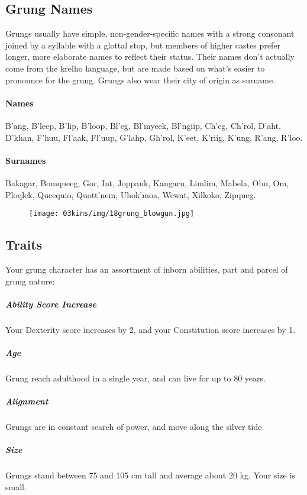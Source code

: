 \subsection*{Grung Names}
Grungs usually have simple, non-gender-specific names with a strong consonant joined by a syllable with a glottal stop, but members of higher castes prefer longer, more elaborate names to reflect their status.
Their names don't actually come from the krelho language, but are made based on what's easier to pronounce for the grung.
Grungs also wear their city of origin as surname.

\paragraph{Names}
B'ang, B'leep, B'lip, B'loop, Bl'eg, Bl'myeek, Bl'ngiip, Ch'eg, Ch'rol, D'aht, D'khan, F'huu, Fl'aak, Fl'uup, G'lahp, Gh'rol, K'eet, K'riig, K'ung, R'ang, R'loo.

\paragraph{Surnames} Bakagar, Bomqueeg, Gor, Int, Joppank, Kangaru, Limlim, Mabela, Obu, Om, Ploqlek, Queequio, Quott'nem, Uhok'moa, Wewat, Xilkoko, Zipqueg.

\begin{figure}[!t]
    \centering
    \texttt{[image: 03kins/img/18grung\_blowgun.jpg]}
\end{figure}

\subsection*{Traits}
Your grung character has an assortment of inborn abilities, part and parcel of grung nature:

\subparagraph{Ability Score Increase} Your Dexterity score increases by 2, and your Constitution score increases by 1.

\subparagraph{Age} Grung reach adulthood in a single year, and can live for up to 80 years.

\subparagraph{Alignment} %
Grungs are in constant search of power, and move along the silver tide.

\subparagraph{Size} Grungs stand between 75 and 105 cm tall and average about 20 kg.
Your size is small.

